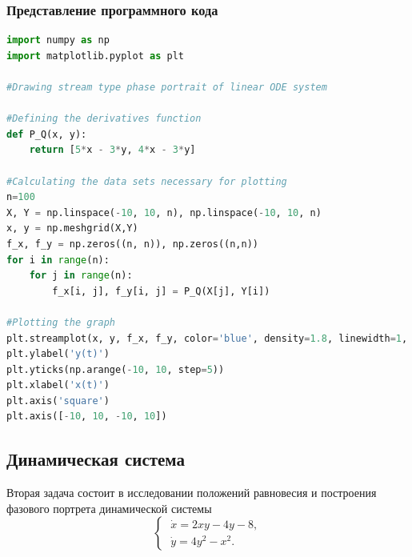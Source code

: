 \documentclass{article}
\begin{document}
\subsubsection{Представление программного кода}
\vspace{0.3cm}
\begin{lstlisting}[language=Python]
import numpy as np
import matplotlib.pyplot as plt

#Drawing stream type phase portrait of linear ODE system

#Defining the derivatives function
def P_Q(x, y):
    return [5*x - 3*y, 4*x - 3*y]

#Calculating the data sets necessary for plotting
n=100
X, Y = np.linspace(-10, 10, n), np.linspace(-10, 10, n)
x, y = np.meshgrid(X,Y)
f_x, f_y = np.zeros((n, n)), np.zeros((n,n))
for i in range(n):
    for j in range(n):
        f_x[i, j], f_y[i, j] = P_Q(X[j], Y[i])
        
#Plotting the graph
plt.streamplot(x, y, f_x, f_y, color='blue', density=1.8, linewidth=1, arrowsize=0.7)
plt.ylabel('y(t)')
plt.yticks(np.arange(-10, 10, step=5))
plt.xlabel('x(t)')
plt.axis('square')
plt.axis([-10, 10, -10, 10])
\end{lstlisting}
\newpage

\subsection{Динамическая система}
Вторая задача состоит в исследовании положений равновесия и построения фазового портрета динамической системы
\vspace{0.2cm}
\begin{equation}
    \begin{cases}
    \;\dot{x} = 2xy-4y-8, \\
    \;\dot{y} = 4y^2-x^2.
    \end{cases} \label{eq:initial2}
\end{equation}
\end{document}
